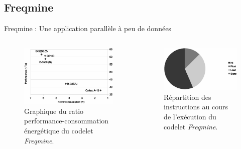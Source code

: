 \documentclass{beamer}
\begin{document}
\subsection{Freqmine}
\begin{frame}{Freqmine : Une application parallèle à peu de données}

\begin{columns}

\begin{column}{0.4\paperwidth}
\begin{figure}
\centering
\includegraphics[width=\textwidth]{Freqmine.eps}
\caption{\label{Freq}Graphique du ratio performance-consommation énergétique du codelet \textit{Freqmine}.}
\end{figure}
\end{column}

\begin{column}{0.4\paperwidth}
\begin{figure}
\centering
\includegraphics[width=\textwidth]{Freqmine_instr.eps}
\caption{\label{Freq_instr}Répartition des instructions au cours de l'exécution du codelet \textit{Freqmine}.}
\end{figure}
\end{column}

\end{columns}

\end{frame}
\end{document}
